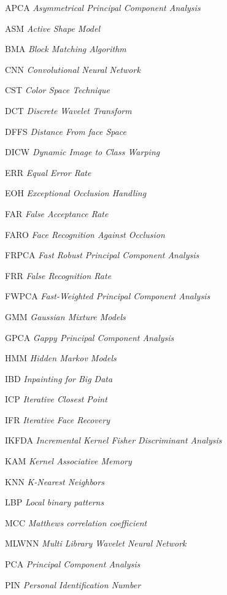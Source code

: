 \begin{siglas}
  \item[APCA] \textit{Asymmetrical Principal Component Analysis}
	\item[ASM] \textit{Active Shape Model}
	\item[BMA] \textit{Block Matching Algorithm}
	\item[CNN] \textit{Convolutional Neural Network
}	\item[CST] \textit{Color Space Technique}
	\item[DCT]  \textit{Discrete Wavelet Transform}
	\item[DFFS]  \textit{Distance From face Space}
	\item[DICW] \textit{Dynamic Image to Class Warping}
	\item[ERR] \textit{Equal Error Rate}
	\item[EOH] \textit{Exceptional Occlusion  Handling}
	\item[FAR] \textit{False Acceptance Rate}
	\item[FARO] \textit{Face Recognition Against Occlusion}
	\item[FRPCA] \textit{Fast Robust Principal Component Analysis}
	\item[FRR] \textit{False Recognition Rate}
	\item[FWPCA] \textit{Fast-Weighted Principal Component Analysis}
	\item[GMM] \textit{Gaussian Mixture Models}
	\item[GPCA] \textit{Gappy Principal Component Analysis}
	\item[HMM] \textit{Hidden Markov Models}
	\item[IBD] \textit{Inpainting for Big Data}
	\item[ICP] \textit{Iterative Closest Point}
	\item[IFR] \textit{Iterative Face Recovery}
	\item[IKFDA]\textit{ Incremental Kernel Fisher Discriminant Analysis}
	\item[KAM] \textit{ Kernel Associative Memory}
	\item[KNN]  \textit{K-Nearest Neighbors}
	\item[LBP] \textit{Local binary patterns}
	\item[MCC] \textit{Matthews correlation coefficient}
	\item[MLWNN] \textit{Multi Library Wavelet Neural Network}
	\item[PCA] \textit{Principal Component Analysis}
	\item[PIN] \textit{Personal Identification Number}

\end{siglas}
